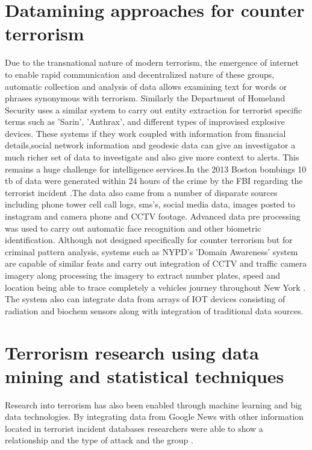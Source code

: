 \section{Datamining approaches for counter terrorism}

Due to the transnational nature of  modern terrorism, the emergence of internet to enable rapid communication and decentralized nature of these groups, automatic collection and analysis of data allows examining text for words or phrases synonymous with terrorism. Similarly  the Department of Homeland Security uses a similar system to carry out entity extraction for terrorist specific terms such as 'Sarin', 'Anthrax', and different types of improvised explosive devices. These systems if they work coupled with information from  financial details,social network information and geodesic data can give an investigator a much richer set of data to investigate and also give more context to alerts. This remains a huge challenge for intelligence services.In the 2013 Boston bombings 10 tb of data were generated within 24 hours of the crime by the FBI regarding the terrorist incident \citep{jeberson2015survey}.The data also came from a number of disparate sources including phone tower cell call logs, sms's, social media data, images posted to instagram and camera phone and CCTV footage. Advanced data pre processing was used to carry out automatic face recognition and other biometric identification. Although not designed specifically for counter terrorism but for criminal pattern analysis, systems such as NYPD's 'Domain Awareness' system are capable of similar feats and carry out integration of CCTV and traffic camera imagery along processing the imagery to extract number plates, speed and location being able to trace completely a vehicles journey throughout New York \citep{coscarelli2012nypd}. The system also can integrate data from arrays of IOT devices consisting of radiation and biochem sensors along with integration of traditional data sources.

\section{Terrorism research using data mining and statistical techniques}
Research into terrorism has also been enabled through machine learning and big data technologies. By integrating data from Google News with other information located in terrorist incident databases researchers were able to show a relationship and the type of attack and the group \citep{strang2015analyzing}.

